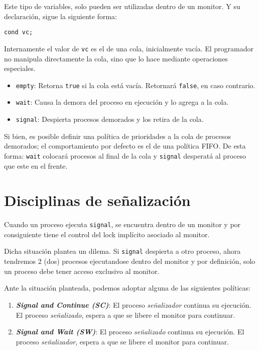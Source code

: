\documentclass[a4paper, 10pt]{report}
\begin{document}
Este tipo de variables, solo pueden ser utilizadas dentro de un monitor. Y su declaración, sigue la siguiente forma:

\begin{lstlisting}
cond vc;
\end{lstlisting}

Internamente el valor de \lstinline{vc} es el de una cola, inicialmente vacía. El programador no manipula directamente la cola, sino que lo hace mediante operaciones especiales.

\begin{itemize}
    \item \lstinline{empty}: Retorna \lstinline{true} si la cola está vacía. Retornará \lstinline{false}, en caso contrario.
    \item \lstinline{wait}: Causa la demora del proceso en ejecución y lo agrega a la cola.
    \item \lstinline{signal}: Despierta procesos demorados y los retira de la cola.
\end{itemize}

Si bien, es posible definir una política de prioridades a la cola de procesos demorados; el comportamiento por defecto es el de una política FIFO. De esta forma: \lstinline{wait} colocará procesos al final de la cola y \lstinline{signal} desperatá al proceso que este en el frente.

\section{Disciplinas de señalización}

Cuando un proceso ejecuta \lstinline{signal}, se encuentra dentro de un monitor y por consiguiente tiene el control del lock implícito asociado al monitor. 

Dicha situación plantea un dilema. Si \lstinline{signal} despierta a otro proceso, ahora tendremos 2 (dos) procesos ejecutandose dentro del monitor y por definición, solo un proceso debe tener acceso exclusivo al monitor.

Ante la situación planteada, podemos adoptar alguna de las siguientes políticas:

\begin{enumerate}
    \item \textbf{\emph{Signal and Continue (SC)}}: El proceso \emph{señalizador} continua su ejecución. El proceso \emph{señalizado}, espera a que se libere el monitor para continuar.
    \item \textbf{\emph{Signal and Wait (SW)}}: El proceso \emph{señalizado} continua su ejecución. El proceso \emph{señalizador}, espera a que se libere el monitor para continuar.
\end{enumerate}
\end{document}
